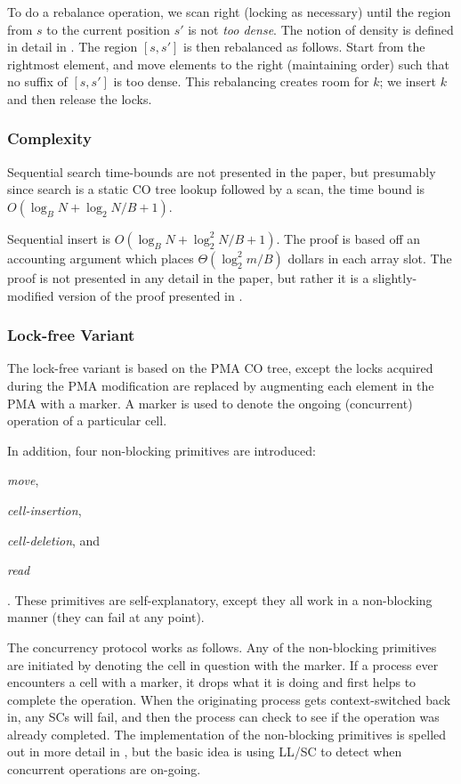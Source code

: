 \documentclass{style}
\begin{document}
To do a rebalance operation, we scan right (locking as necessary) until the
region from $s$ to the current position $s'$ is not \textit{too dense}. The
notion of density is defined in detail in \cite{BenderFiGi05}. The region $[s,
s']$ is then rebalanced as follows. Start from the rightmost element, and move
elements to the right (maintaining order) such that no suffix of $[s, s']$ is
too dense. This rebalancing creates room for $k$; we insert $k$ and then
release the locks.

\subsubsection{Complexity}


Sequential search time-bounds are not presented in the paper, but presumably
since search is a static CO tree lookup followed by a scan, the time bound is
$O(\log_{B}{N} + {\log_2{N}}/{B} + 1)$.

Sequential insert is $O(\log_{B}{N} + \log_2^2{N}/{B} + 1)$. The proof is
based off an accounting argument which places $\Theta(\log_2^2{m}/B)$ dollars
in each array slot. The proof is not presented in any detail in the paper, but
rather it is a slightly-modified version of the proof presented in
\cite{Katriel02}.

\subsubsection{Lock-free Variant}

The lock-free variant is based on the PMA CO tree, except the locks acquired
during the PMA modification are replaced by augmenting each element in the PMA
with a marker. A marker is used to denote the ongoing (concurrent) operation
of a particular cell.

In addition, four non-blocking primitives are introduced:
\begin{inparaenum}[(a)]
  \item \textit{move},
  \item \textit{cell-insertion},
  \item \textit{cell-deletion}, and
  \item \textit{read}
\end{inparaenum}. These primitives are self-explanatory, except they
all work in a non-blocking manner (they can fail at any point).

The concurrency protocol works as follows. Any of the non-blocking primitives
are initiated by denoting the cell in question with the marker. If a process
ever encounters a cell with a marker, it drops what it is doing and first
helps to complete the operation. When the originating process gets
context-switched back in, any SCs will fail, and then the process can check to
see if the operation was already completed. The implementation of the
non-blocking primitives is spelled out in more detail in \cite{BenderFiGi05},
but the basic idea is using LL/SC to detect when concurrent operations are
on-going.
\end{document}
